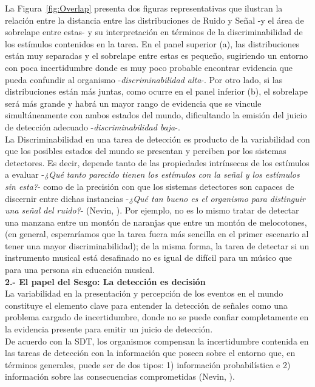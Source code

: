 La Figura~\ref{fig:Overlap} presenta dos figuras representativas que ilustran la relación entre la distancia entre las distribuciones de Ruido y Señal -y el área de sobrelape entre estas- y su interpretación en términos de la discriminabilidad de los estímulos contenidos en la tarea. En el panel superior (a), las distribuciones están muy separadas y el sobrelape entre estas es pequeño, sugiriendo un entorno con poca incertidumbre donde es muy poco probable encontrar evidencia que pueda confundir al organismo -\textit{discriminabilidad alta}-. Por otro lado, si las distribuciones están más juntas, como ocurre en el panel inferior (b), el sobrelape será más grande y habrá un mayor rango de evidencia que se vincule simultáneamente con ambos estados del mundo, dificultando la emisión del juicio de detección adecuado -\textit{discriminabilidad baja}-.\\

La Discriminabilidad en una tarea de detección es producto de la variabilidad con que los posibles estados del mundo se presentan y perciben por los sistemas detectores. Es decir, depende tanto de las propiedades intrínsecas de los estímulos a evaluar -\textit{¿Qué tanto parecido tienen los estímulos con la señal y los estímulos sin esta?}- como de la precisión con que los sistemas detectores son capaces de discernir entre dichas instancias -\textit{¿Qué tan bueno es el organismo para distinguir una señal del ruido?}- (Nevin, \citeyear{Nevin1969}). Por ejemplo, no es lo mismo tratar de detectar una manzana entre un montón de naranjas que entre un montón de melocotones, (en general, esperaríamos que la tarea fuera más sencilla en el primer escenario al tener una mayor discriminabilidad); de la misma forma, la tarea de detectar si un instrumento musical está desafinado no es igual de difícil para un músico que para una persona sin educación musical.\\

  \textbf{2.- El papel del Sesgo: La detección es decisión}\\

La variabilidad en la presentación y percepción de los eventos en el mundo constituye el elemento clave para entender la detección de señales como una problema cargado de incertidumbre, donde no se puede confiar completamente en la evidencia presente para emitir un juicio de detección.\\

De acuerdo con la SDT, los organismos compensan la incertidumbre contenida en las tareas de detección con la información que poseen sobre el entorno que, en términos generales, puede ser de dos tipos: 1) información probabilística e 2) información sobre las consecuencias comprometidas (Nevin, \citeyear{Nevin1969}).\\

